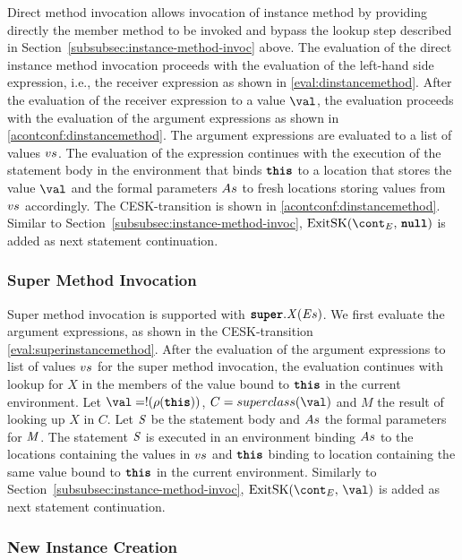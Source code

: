 \documentclass[a4paper,oneside,fleqn]{article}
\newcommand{\synt}[1]{\ensuremath{\text{\textbf{\texttt{#1}}}}}
\DeclareMathOperator{\nnull}{\synt{null}}
\newcommand{\this}{\synt{this}}
\newcommand{\idmeta}{\ensuremath{\mathit{X}}}
\begin{document}
Direct method invocation allows invocation of instance method by providing directly the member method to be invoked and bypass the lookup step described in Section~\ref{subsubsec:instance-method-invoc} above.
The evaluation of the direct instance method invocation proceeds with the evaluation of the left-hand side expression, i.e., the receiver expression as shown in \eqref{eval:dinstancemethod}.
After the evaluation of the receiver expression to a value $\val$, the evaluation proceeds with the evaluation of the argument expressions as shown in \eqref{acontconf:dinstancemethod}.
The argument expressions are evaluated to a list of values $vs$.
The evaluation of the expression continues with the execution of the statement body in the environment that binds $\this$ to a location that stores the value $\val$ and the formal parameters $As$ to fresh locations storing values from $vs$ accordingly.
The CESK-transition is shown in \eqref{acontconf:dinstancemethod}.
Similar to Section~\ref{subsubsec:instance-method-invoc}, $\ExitSK{\nnull}$ is added as next statement continuation.


\subsubsection{Super Method Invocation}
\label{subsubsec:super-method-invoc}

Super method invocation is supported with $\SuperMethodInvocation{\idmeta}{\expressionsmeta}$.
We first evaluate the argument expressions, as shown in the CESK-transition \eqref{eval:superinstancemethod}.
After the evaluation of the argument expressions to list of values $vs$ for the super method invocation, the evaluation continues with lookup for $\idmeta$ in the members of the value bound to $\this$ in the current environment.
Let $\val = \deref{(\env(\this))}$, $C = \superclass{\val}$ and $M$ the result of looking up $\idmeta$ in $C$.
Let $\mathit{S}$ be the statement body and $As$ the formal parameters for $\mathit{M}$.
The statement $\mathit{S}$ is executed in an environment binding $As$ to the locations containing the values in $vs$ and $\this$ binding to location containing the same value bound to $\this$ in the current environment.
Similarly to Section~\ref{subsubsec:instance-method-invoc}, $\ExitSK{\val}$ is added as next statement continuation.


\subsubsection{New Instance Creation}
\label{subsubsec:new-instance}
\end{document}
